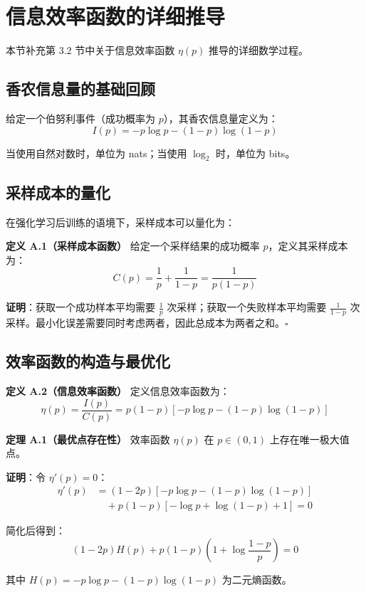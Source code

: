 \section{信息效率函数的详细推导}
\label{sec:efficiency_proof}

本节补充第 3.2 节中关于信息效率函数 $\eta(p)$ 推导的详细数学过程。

\subsection{香农信息量的基础回顾}

给定一个伯努利事件（成功概率为 $p$），其香农信息量定义为：
$$I(p) = -p \log p - (1-p) \log (1-p)$$

当使用自然对数时，单位为 nats；当使用 $\log_2$ 时，单位为 bits。

\subsection{采样成本的量化}

在强化学习后训练的语境下，采样成本可以量化为：

\textbf{定义 A.1（采样成本函数）} 给定一个采样结果的成功概率 $p$，定义其采样成本为：
$$C(p) = \frac{1}{p} + \frac{1}{1-p} = \frac{1}{p(1-p)}$$

\textbf{证明}：获取一个成功样本平均需要 $\frac{1}{p}$ 次采样；获取一个失败样本平均需要 $\frac{1}{1-p}$ 次采样。最小化误差需要同时考虑两者，因此总成本为两者之和。$\square$

\subsection{效率函数的构造与最优化}

\textbf{定义 A.2（信息效率函数）} 定义信息效率函数为：
$$\eta(p) = \frac{I(p)}{C(p)} = p(1-p) \left[ -p \log p - (1-p) \log (1-p) \right]$$

\textbf{定理 A.1（最优点存在性）} 效率函数 $\eta(p)$ 在 $p \in (0, 1)$ 上存在唯一极大值点。

\textbf{证明}：令 $\eta'(p) = 0$：
\begin{align*}
\eta'(p) &= (1-2p) \left[ -p \log p - (1-p) \log (1-p) \right] \\
         &\quad + p(1-p) \left[ -\log p + \log(1-p) + 1 \right] = 0
\end{align*}

简化后得到：
$$(1-2p) H(p) + p(1-p) \left( 1 + \log \frac{1-p}{p} \right) = 0$$

其中 $H(p) = -p \log p - (1-p) \log(1-p)$ 为二元熵函数。

